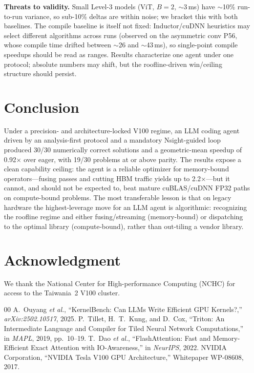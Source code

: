 \documentclass[conference]{IEEEtran}
\begin{document}
\textbf{Threats to validity.} Small Level-3 models (ViT, $B{=}2$, $\sim$3\,ms)
have $\sim$10\% run-to-run variance, so sub-10\% deltas are within noise; we
bracket this with both baselines. The compile baseline is itself not fixed:
Inductor/cuDNN heuristics may select different algorithms across runs (observed
on the asymmetric conv P56, whose compile time drifted between $\sim$26 and
$\sim$43\,ms), so single-point compile speedups should be read as ranges.
Results characterize one agent under one protocol; absolute numbers may shift,
but the roofline-driven win/ceiling structure should persist.

\section{Conclusion}
Under a precision- and architecture-locked V100 regime, an LLM coding agent
driven by an analysis-first protocol and a mandatory Nsight-guided loop produced
30/30 numerically correct solutions and a geometric-mean speedup of 0.92$\times$
over eager, with 19/30 problems at or above parity. The results expose a clean
capability ceiling: the agent is a reliable optimizer for memory-bound
operators---fusing passes and cutting HBM traffic yields up to 2.2$\times$---but
it cannot, and should not be expected to, beat mature cuBLAS/cuDNN FP32 paths on
compute-bound problems. The most transferable lesson is that on legacy hardware
the highest-leverage move for an LLM agent is algorithmic: recognizing the
roofline regime and either fusing/streaming (memory-bound) or dispatching to the
optimal library (compute-bound), rather than out-tiling a vendor library.

\section*{Acknowledgment}
We thank the National Center for High-performance Computing (NCHC) for access to
the Taiwania~2 V100 cluster.

\begin{thebibliography}{00}
 A.~Ouyang \emph{et al.}, ``KernelBench: Can LLMs Write
Efficient GPU Kernels?,'' \emph{arXiv:2502.10517}, 2025.
 P.~Tillet, H.~T.~Kung, and D.~Cox, ``Triton: An Intermediate
Language and Compiler for Tiled Neural Network Computations,'' in \emph{MAPL},
2019, pp.~10--19.
 T.~Dao \emph{et al.}, ``FlashAttention: Fast and
Memory-Efficient Exact Attention with IO-Awareness,'' in \emph{NeurIPS}, 2022.
 NVIDIA Corporation, ``NVIDIA Tesla V100 GPU Architecture,''
Whitepaper WP-08608, 2017.
\end{thebibliography}
\end{document}
